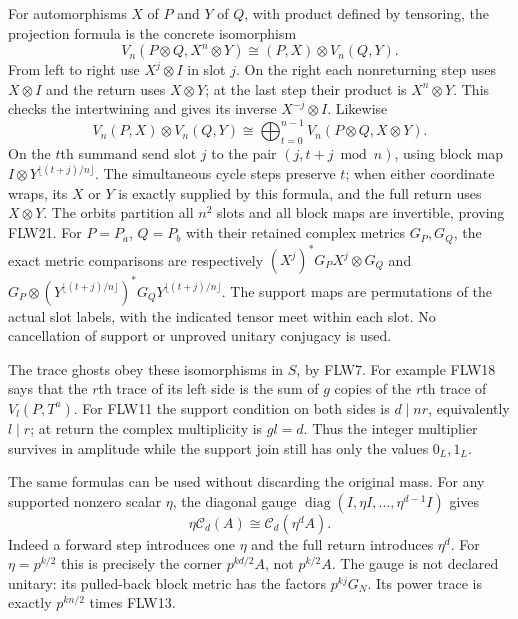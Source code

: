 For automorphisms $X$ of $P$ and $Y$ of $Q$, with product defined by
tensoring, the projection formula is the concrete isomorphism
\[
 V_n(P\otimes Q,X^n\otimes Y)
                 \cong(P,X)\otimes V_n(Q,Y).
 \tag{FLW20}
\]
From left to right use $X^j\otimes I$ in slot $j$. On the right
each nonreturning step uses $X\otimes I$ and the return uses
$X\otimes Y$; at the last step their product is $X^n\otimes Y$.
This checks the intertwining and gives its inverse $X^{-j}\otimes I$.
Likewise
\[
 V_n(P,X)\otimes V_n(Q,Y)
                 \cong\bigoplus_{t=0}^{n-1}V_n(P\otimes Q,X\otimes Y).
 \tag{FLW21}
\]
On the $t$th summand send slot $j$ to the pair
$(j,t+j\bmod n)$, using block map
$I\otimes Y^{\lfloor(t+j)/n\rfloor}$.
The simultaneous cycle steps preserve $t$; when either coordinate
wraps, its $X$ or $Y$ is exactly supplied by this formula, and the
full return uses $X\otimes Y$. The orbits partition all $n^2$
slots and all block maps are invertible, proving FLW21.
For $P=P_a$, $Q=P_b$ with their retained complex metrics
$G_P,G_Q$, the exact metric comparisons are respectively
$(X^j)^*G_PX^j\otimes G_Q$ and
$G_P\otimes (Y^{\lfloor(t+j)/n\rfloor})^*G_Q
                         Y^{\lfloor(t+j)/n\rfloor}$.
The support maps are permutations of the actual slot labels,
with the indicated tensor meet within each slot. No cancellation
of support or unproved unitary conjugacy is used.

The trace ghosts obey these isomorphisms in $S$, by FLW7. For example
FLW18 says that the $r$th trace of its left side is the sum of $g$
copies of the $r$th trace of $V_l(P,T^a)$.
For FLW11 the support condition on both sides is
$d\mid nr$, equivalently $l\mid r$; at return the complex
multiplicity is $gl=d$. Thus the integer multiplier survives in
amplitude while the support join still has only the values $0_L,1_L$.

The same formulas can be used without discarding the original mass.
For any supported nonzero scalar $\eta$, the diagonal gauge
$\operatorname{diag}(I,\eta I,\ldots,\eta^{d-1}I)$ gives
\[
 \eta\mathcal C_d(A)\cong\mathcal C_d(\eta^d A).
 \tag{FLW22}
\]
Indeed a forward step introduces one $\eta$ and the full return
introduces $\eta^d$. For $\eta=p^{k/2}$ this is precisely the
corner $p^{kd/2}A$, not $p^{k/2}A$. The gauge is not declared
unitary: its pulled-back block metric has the factors
$p^{kj}G_N$. Its power trace is exactly $p^{kn/2}$ times FLW13.


